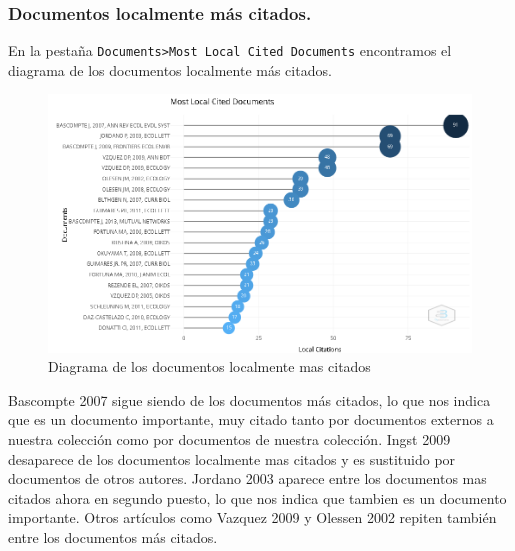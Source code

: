 \documentclass[
]{article}
\begin{document}
\hypertarget{documentos-localmente-muxe1s-citados.}{%
\subsubsection{Documentos localmente más
citados.}\label{documentos-localmente-muxe1s-citados.}}

En la pestaña
\texttt{Documents\textgreater{}Most\ Local\ Cited\ Documents}
encontramos el diagrama de los documentos localmente más citados.

\begin{figure}
\centering
\includegraphics{MostLocalCitedDocuments.png}
\caption{Diagrama de los documentos localmente mas citados}
\end{figure}

Bascompte 2007 sigue siendo de los documentos más citados, lo que nos
indica que es un documento importante, muy citado tanto por documentos
externos a nuestra colección como por documentos de nuestra colección.
Ingst 2009 desaparece de los documentos localmente mas citados y es
sustituido por documentos de otros autores. Jordano 2003 aparece entre
los documentos mas citados ahora en segundo puesto, lo que nos indica
que tambien es un documento importante. Otros artículos como Vazquez
2009 y Olessen 2002 repiten también entre los documentos más citados.
\end{document}
